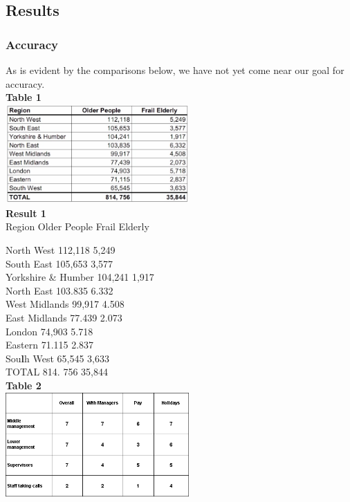 \documentclass[a4paper,12pt]{article}
\begin{document}
	\subsection{Results}
		\subsubsection{Accuracy}
		As is evident by the comparisons below, we have not yet come near our goal for accuracy.\\
		
		\textbf {Table 1}\\
		\includegraphics[width=7cm]{Images/Tables/table.jpg}\\
		
		\textbf{Result 1}\\
		Region Older People Frail Elderly

		North West 112,118 5,249\\
		South East 105,653 3,577\\
		Yorkshire \& Humber 104,241 1,917\\
		North East 103.835 6.332\\
		West Midlands 99,917 4.508\\
		East Midlands 77.439 2.073\\
		London 74,903 5.718\\
		Eastern 71.115 2.837\\
		Sou\textbf{l}h West 65,545 3,633\\
		TOTAL 814. 756 35,844\\
		
		\textbf {Table 2}\\
		\includegraphics[width=7cm]{Images/Tables/8Table9.png}\\
		
\end{document}
